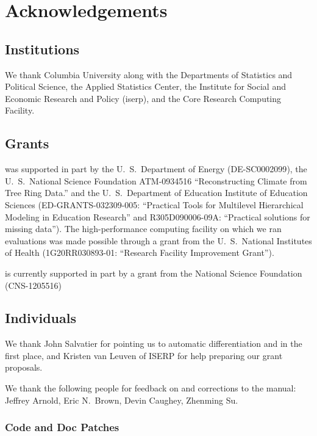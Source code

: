 \chapter*{Acknowledgements}

\section*{Institutions}

We thank Columbia University along with the Departments of
Statistics and Political Science, the Applied Statistics Center, the
Institute for Social and Economic Research and Policy ({\sc iserp}),
and the Core Research Computing Facility.

\section*{Grants}

\Stan was supported in part by 
%
the U.~S.\ Department of Energy 
({\small DE-SC0002099}), 
%
the U.~S.\ National Science Foundation 
{\small ATM-0934516}
``Reconstructing Climate from Tree Ring Data.''
and 
%
the U.~S.\ Department of Education Institute of Education Sciences 
({\small ED-GRANTS-032309-005}:
 ``Practical Tools for Multilevel Hierarchical Modeling in Education
 Research'' and
 {\small R305D090006-09A}:
 ``Practical solutions for missing data'').
%
The high-performance computing
facility on which we ran evaluations was made possible through 
a grant from the U.~S.\ National Institutes of Health 
({\small 1G20RR030893-01}:
 ``Research Facility Improvement Grant'').

\Stan is currently supported in part by a grant from the National
Science Foundation (CNS-1205516)

\section*{Individuals}

We thank John Salvatier for pointing us to automatic differentiation
and \HMC in the first place, and Kristen van Leuven of ISERP for help
preparing our grant proposals.

We thank the following people for feedback on and corrections to the
manual:  Jeffrey Arnold, Eric N.~Brown, Devin Caughey,
Zhenming Su.

\subsection*{Code  and Doc Patches}

